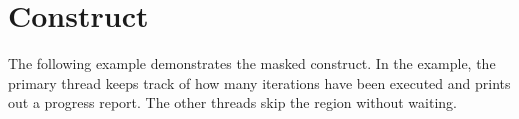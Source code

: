 \pagebreak
\section{ Construct}
\label{sec:masked}

The following example demonstrates the masked construct. In the example, the primary thread
keeps track of how many iterations have been executed and prints out a progress 
report. The other threads skip the  region without waiting.




